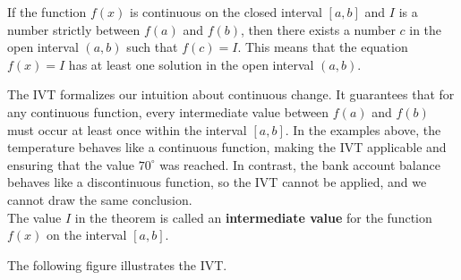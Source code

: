 \documentclass[handout]{ximera}
\begin{document}
\begin{theorem}
If the function $f(x)$ is continuous on the closed interval $[a, b]$ 
and $I$ is a number strictly between $f(a)$ and $f(b)$,
then there exists a number $c$ in the open interval $(a,b)$ such that $f(c) = I$.
This means that the equation $f(x) = I$ has at least one solution in the open interval $(a,b)$. 
\end{theorem}
The IVT formalizes our intuition about continuous change. It guarantees that for any continuous function, 
every intermediate value between \( f(a) \) and \( f(b) \) must occur at least once within the interval \([a, b]\).
In the examples above, the temperature behaves like a continuous function, making the IVT applicable and ensuring that the value \(70^\circ\) was reached. 
In contrast, the bank account balance behaves like a discontinuous function, so the IVT cannot be applied, and we cannot draw the same conclusion.\\
The value $I$ in the theorem is called an \textbf{intermediate value} for the function $f(x)$ 
on the interval $[a,b]$. 

The following figure illustrates the IVT.

\begin{image}
\end{image}
\end{document}
